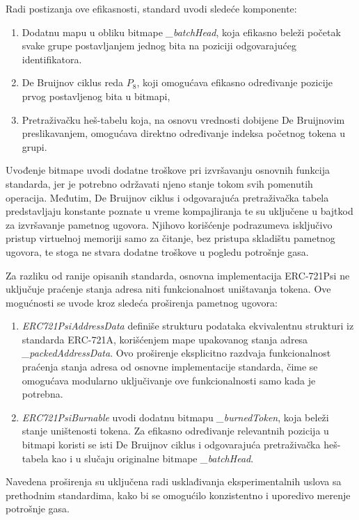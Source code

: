Radi postizanja ove efikasnosti, standard uvodi sledeće komponente:
\begin{enumerate}
\item Dodatnu mapu u obliku bitmape \textit{\_batchHead}, koja efikasno beleži početak svake grupe postavljanjem jednog bita na poziciji odgovarajućeg identifikatora.
\item De Bruijnov ciklus \cite{de1946combinatorial} reda $P_8$, koji omogućava efikasno određivanje pozicije prvog postavljenog bita u bitmapi,
\item Pretraživačku heš-tabelu koja, na osnovu vrednosti dobijene De Bruijnovim preslikavanjem, omogućava direktno određivanje indeksa početnog tokena u grupi.
\end{enumerate}

Uvođenje bitmape uvodi dodatne troškove pri izvršavanju osnovnih funkcija standarda, jer je potrebno održavati njeno stanje tokom svih pomenutih operacija. Međutim, De Bruijnov ciklus i odgovarajuća pretraživačka tabela predstavljaju konstante poznate u vreme kompajliranja te su uključene u bajtkod za izvršavanje pametnog ugovora. Njihovo korišćenje podrazumeva isključivo pristup virtuelnoj memoriji samo za čitanje, bez pristupa skladištu pametnog ugovora, te stoga ne stvara dodatne troškove u pogledu potrošnje gasa.

Za razliku od ranije opisanih standarda, osnovna implementacija ERC-721Psi ne uključuje praćenje stanja adresa niti funkcionalnost uništavanja tokena. Ove mogućnosti se uvode kroz sledeća proširenja pametnog ugovora:

\begin{enumerate}
\item \textit{ERC721PsiAddressData} definiše strukturu podataka ekvivalentnu strukturi iz standarda ERC-721A, korišćenjem mape upakovanog stanja adresa \textit{\_packedAddressData}. Ovo proširenje eksplicitno razdvaja funkcionalnost praćenja stanja adresa od osnovne implementacije standarda, čime se omogućava modularno uključivanje ove funkcionalnosti samo kada je potrebna.
\item \textit{ERC721PsiBurnable} uvodi dodatnu bitmapu \textit{\_burnedToken}, koja beleži stanje uništenosti tokena. Za efikasno određivanje relevantnih pozicija u bitmapi koristi se isti De Bruijnov ciklus i odgovarajuća pretraživačka heš-tabela kao i u slučaju originalne bitmape \textit{\_batchHead}.
\end{enumerate}
Navedena proširenja su uključena radi usklađivanja eksperimentalnih uslova sa prethodnim standardima, kako bi se omogućilo konzistentno i uporedivo merenje potrošnje gasa.

